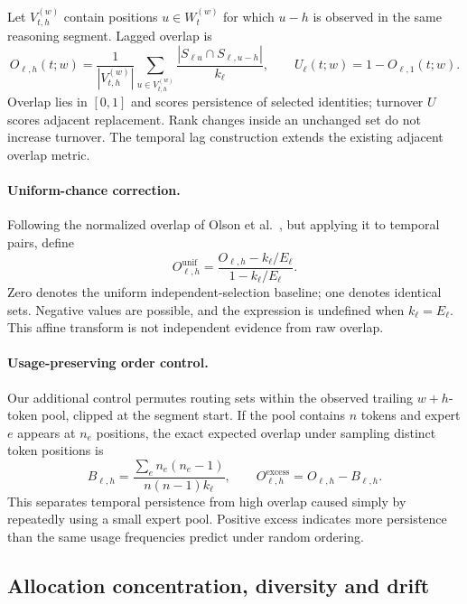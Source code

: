 Let $V_{t,h}^{(w)}$ contain positions $u\in W_t^{(w)}$ for which $u-h$ is
observed in the same reasoning segment. Lagged overlap is
\begin{equation}
 O_{\ell,h}(t;w)=\frac{1}{|V_{t,h}^{(w)}|}
 \sum_{u\in V_{t,h}^{(w)}}
 \frac{|S_{\ell u}\cap S_{\ell,u-h}|}{k_\ell},
 \qquad U_\ell(t;w)=1-O_{\ell,1}(t;w).
 \label{eq:new-overlap}
\end{equation}
Overlap lies in $[0,1]$ and scores persistence of selected identities; turnover
$U$ scores adjacent replacement. Rank changes inside an unchanged set do not
increase turnover. The temporal lag construction extends the existing adjacent
overlap metric.

\paragraph{Uniform-chance correction.}
Following the normalized overlap of Olson et al.~\cite{newmetrics_olson2025},
but applying it to temporal pairs, define
\begin{equation}
 O^{\mathrm{unif}}_{\ell,h}
 =\frac{O_{\ell,h}-k_\ell/E_\ell}{1-k_\ell/E_\ell}.
 \label{eq:new-corrected-overlap}
\end{equation}
Zero denotes the uniform independent-selection baseline; one denotes identical
sets. Negative values are possible, and the expression is undefined when
$k_\ell=E_\ell$. This affine transform is not independent evidence from raw overlap.

\paragraph{Usage-preserving order control.}
Our additional control permutes routing sets within the observed trailing
$w+h$-token pool, clipped at the segment start. If the pool contains $n$ tokens
and expert $e$ appears at $n_e$ positions, the exact expected overlap under
sampling distinct token positions is
\begin{equation}
 B_{\ell,h}=\frac{\sum_e n_e(n_e-1)}{n(n-1)k_\ell},
 \qquad O^{\mathrm{excess}}_{\ell,h}=O_{\ell,h}-B_{\ell,h}.
 \label{eq:new-shuffled-overlap}
\end{equation}
This separates temporal persistence from high overlap caused simply by repeatedly
using a small expert pool. Positive excess indicates more persistence than the
same usage frequencies predict under random ordering.

\subsection{Allocation concentration, diversity and drift}


